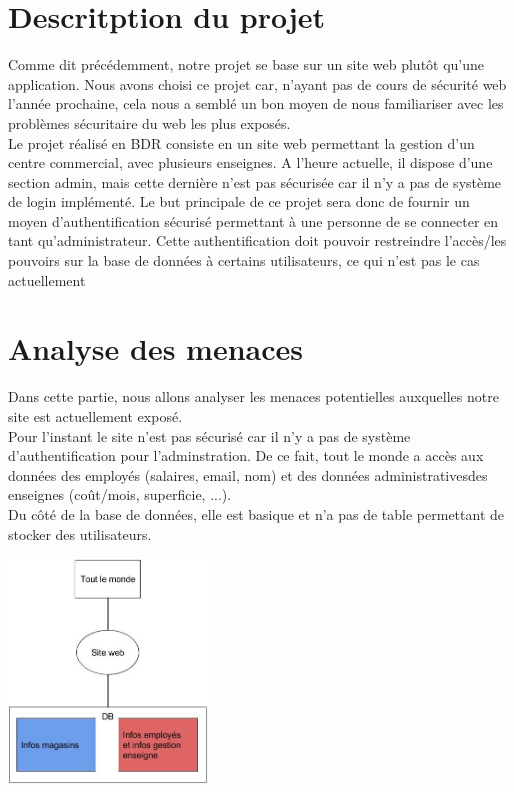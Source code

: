 \documentclass[a4paper]{article}
\begin{document}
\section{Descritption du projet}
Comme dit précédemment, notre projet se base sur un site web plutôt qu'une application. Nous avons choisi ce projet car, n'ayant pas de cours de sécurité web l'année prochaine, cela nous a semblé un bon moyen de nous familiariser avec les problèmes sécuritaire du web les plus exposés.\\
Le projet réalisé en BDR consiste en un site web permettant la gestion d'un centre commercial, avec plusieurs enseignes. A l'heure actuelle, il dispose d'une section admin, mais cette dernière n'est pas sécurisée car il n'y a pas de système de login implémenté. Le but principale de ce projet sera donc de fournir un moyen d'authentification sécurisé permettant à une personne de se connecter en tant qu'administrateur. Cette authentification doit pouvoir restreindre l'accès/les pouvoirs sur la base de données à certains utilisateurs, ce qui n'est pas le cas actuellement

\section{Analyse des menaces}
Dans cette partie, nous allons analyser les menaces potentielles auxquelles notre site est actuellement exposé.\\
Pour l'instant le site n'est pas sécurisé car il n'y a pas de système d'authentification pour l'adminstration. De ce fait, tout le monde a accès aux données des employés (salaires, email, nom) et des données administrativesdes enseignes (coût/mois, superficie, ...).\\
Du côté de la base de données, elle est basique et n'a pas de table permettant de stocker des utilisateurs.

\begin{center}
 \includegraphics[width=200px]{img/DFD_actuelle}
\end{center}
\end{document}
